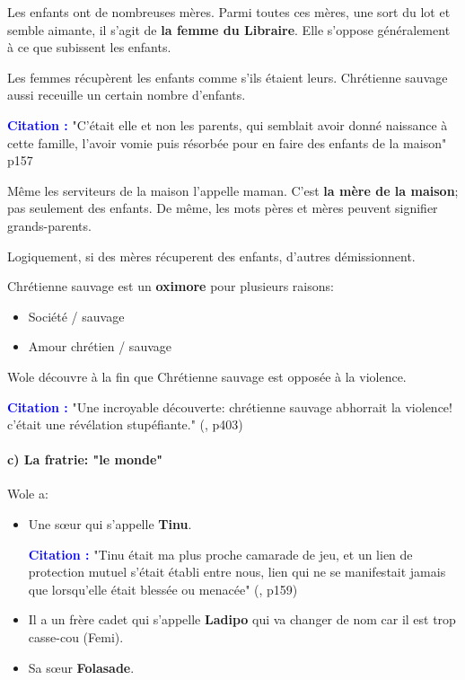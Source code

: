 \documentclass[a4paper, 11pt, hidelinks]{article}
\newcommand{\bs}{\bigskip}
\newcommand{\cit}{\large \textcolor{blue}{\textbf{Citation :}} \large }
\newcommand{\rb}[1]{\Romanbar{#1}}
\begin{document}
Les enfants ont de nombreuses mères. Parmi toutes ces mères, une sort du lot et semble aimante, il s'agit de \textbf{la femme du Libraire}.
Elle s'oppose généralement à ce que subissent les enfants.

\bs

Les femmes récupèrent les enfants comme s'ils étaient leurs.
Chrétienne sauvage aussi receuille un certain nombre d'enfants.

\cit "C'était elle et non les parents, qui semblait avoir donné naissance à cette famille, l'avoir vomie puis résorbée pour en faire des enfants de la maison" \rb{6} p157
\bs

Même les serviteurs de la maison l'appelle maman. C'est \textbf{la mère de la maison}; pas seulement des enfants.
De même, les mots pères et mères peuvent signifier grands-parents.

\bs
Logiquement, si des mères récuperent des enfants, d'autres démissionnent.

\bs
Chrétienne sauvage est un \textbf{oximore} pour plusieurs raisons:
\begin{itemize}
    \item Société / sauvage
    \item Amour chrétien / sauvage
\end{itemize}
\bs

Wole découvre à la fin que Chrétienne sauvage est opposée à la violence.

\cit "Une incroyable découverte: chrétienne sauvage abhorrait la violence! c'était une révélation stupéfiante." (\rb{14}, p403)




\paragraph{c) La fratrie: "le monde"}


Wole a:

\begin{itemize}
    \item Une s\oe ur qui s'appelle \textbf{Tinu}.
          \bs

          \cit "Tinu était ma plus proche camarade de jeu, et un lien de protection mutuel s'était établi entre nous, lien qui ne se manifestait jamais que
          lorsqu'elle était blessée ou menacée" (\rb{6}, p159)
          \bs

    \item Il a un frère cadet qui s'appelle \textbf{Ladipo} qui va changer de nom car il est trop casse-cou (Femi).
    \item Sa s\oe ur \textbf{Folasade}.
\end{itemize}
\end{document}

